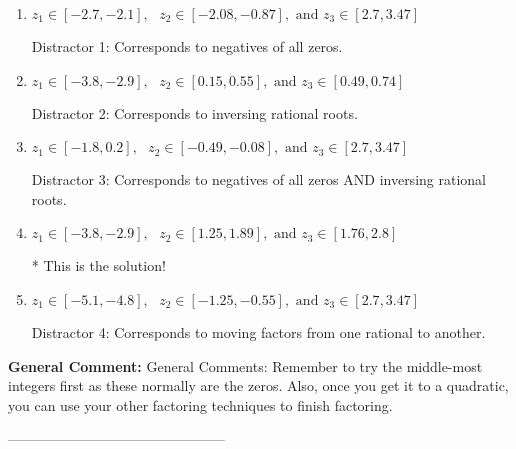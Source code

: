 \documentclass{extbook}[14pt]
\begin{document}
\begin{enumerate}[label=\Alph*.] 
\item $ z_1 \in [-2.7, -2.1], \text{   }  z_2 \in [-2.08, -0.87], \text{   and   } z_3 \in [2.7, 3.47] $ 

  Distractor 1: Corresponds to negatives of all zeros. 
\item $ z_1 \in [-3.8, -2.9], \text{   }  z_2 \in [0.15, 0.55], \text{   and   } z_3 \in [0.49, 0.74] $ 

  Distractor 2: Corresponds to inversing rational roots. 
\item $ z_1 \in [-1.8, 0.2], \text{   }  z_2 \in [-0.49, -0.08], \text{   and   } z_3 \in [2.7, 3.47] $ 

  Distractor 3: Corresponds to negatives of all zeros AND inversing rational roots. 
\item $ z_1 \in [-3.8, -2.9], \text{   }  z_2 \in [1.25, 1.89], \text{   and   } z_3 \in [1.76, 2.8] $ 

 * This is the solution! 
\item $ z_1 \in [-5.1, -4.8], \text{   }  z_2 \in [-1.25, -0.55], \text{   and   } z_3 \in [2.7, 3.47] $ 

  Distractor 4: Corresponds to moving factors from one rational to another. 
\end{enumerate} 
 
\textbf{General Comment:} General Comments: Remember to try the middle-most integers first as these normally are the zeros. Also, once you get it to a quadratic, you can use your other factoring techniques to finish factoring. 

-----------------------------------------------
\end{document}
